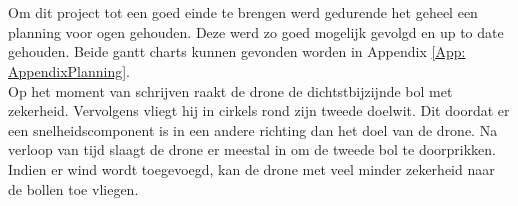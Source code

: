 \\
\\
Om dit project tot een goed einde te brengen werd gedurende het geheel een planning voor ogen gehouden. Deze werd zo goed mogelijk gevolgd en up to date gehouden. Beide gantt charts kunnen gevonden worden in Appendix \ref{App: AppendixPlanning}.
\\
Op het moment van schrijven raakt de drone de dichtstbijzijnde bol met zekerheid. Vervolgens vliegt hij in cirkels rond zijn tweede doelwit. Dit doordat er een snelheidscomponent is in een andere richting dan het doel van de drone. Na verloop van tijd slaagt de drone er meestal in om de tweede bol te doorprikken. Indien er wind wordt toegevoegd, kan de drone met veel minder zekerheid naar de bollen toe vliegen. 
